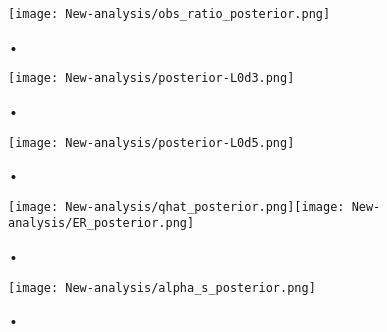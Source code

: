 \begin{figure}
\centering
\texttt{[image: New-analysis/obs\_ratio\_posterior.png]}
\caption{•}
\label{fig:new:obs_ratio_posterior}
\end{figure}

\begin{figure}
\centering
\texttt{[image: New-analysis/posterior-L0d3.png]}
\caption{•}
\label{fig:new:posterior-l0d3}
\end{figure}

\begin{figure}
\centering
\texttt{[image: New-analysis/posterior-L0d5.png]}
\caption{•}
\label{fig:new:posterior-l0d5}
\end{figure}

\begin{figure}
\centering
\texttt{[image: New-analysis/qhat\_posterior.png]}\texttt{[image: New-analysis/ER\_posterior.png]}
\caption{•}
\label{fig:new:posterior-qhat}
\end{figure}

\begin{figure}
\centering
\texttt{[image: New-analysis/alpha\_s\_posterior.png]}
\caption{•}
\label{fig:new:posterior-alphas}
\end{figure}
